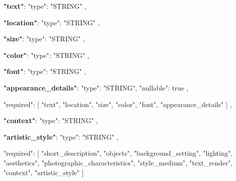 \begin{table}[t]
\begin{tcolorbox}[
    colback=gray!3,
    colframe=gray!30,
    sharp corners,
    left=3pt,right=3pt,top=2pt,bottom=2pt,
    before skip=2pt, after skip=2pt,        
    fontupper=\ttfamily\scriptsize,    
]
\quad\quad\textbf{"text"}: 
"type": "STRING"
,

\quad\quad\textbf{"location"}: 
"type": "STRING"
,

\quad\quad\textbf{"size"}: 
"type": "STRING"
,

\quad\quad\textbf{"color"}: 
"type": "STRING"
,

\quad\quad\textbf{"font"}: 
"type": "STRING"
,

\quad\quad\textbf{"appearance\_details"}: 
"type": "STRING",
"nullable": true
,

\quad\quad"required": [
"text",
"location",
"size",
"color",
"font",
"appearance\_details"
]
,

\quad \textbf{"context"}: 
"type": "STRING"
,

\quad \textbf{"artistic\_style"}: 
"type": "STRING"
,

"required": [
"short\_description",
"objects",
"background\_setting",
"lighting",
"aesthetics",
"photographic\_characteristics",
"style\_medium",
"text\_render",
"context",
"artistic\_style"
]
\end{tcolorbox}
\caption{Gemini's Structured Outputs.}\label{tab:strcutured_outputs}
\end{table}

